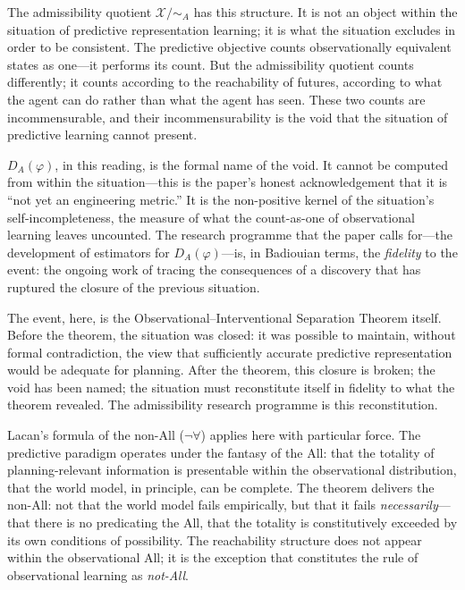 \documentclass[10pt,a4paper]{article}
\begin{document}
The admissibility quotient $\mathcal{X}/{\sim_A}$ has this structure. It is
not an object within the situation of predictive representation learning; it
is what the situation excludes in order to be consistent. The predictive
objective counts observationally equivalent states as one---it performs its
count. But the admissibility quotient counts differently; it counts according
to the reachability of futures, according to what the agent can do rather than
what the agent has seen. These two counts are incommensurable, and their
incommensurability is the void that the situation of predictive learning cannot
present.

$D_A(\varphi)$, in this reading, is the formal name of the void. It cannot be
computed from within the situation---this is the paper's honest acknowledgement
that it is ``not yet an engineering metric.'' It is the non-positive kernel of
the situation's self-incompleteness, the measure of what the count-as-one of
observational learning leaves uncounted. The research programme that the paper
calls for---the development of estimators for $D_A(\varphi)$---is, in Badiouian
terms, the \emph{fidelity} to the event: the ongoing work of tracing the
consequences of a discovery that has ruptured the closure of the previous
situation.

The event, here, is the Observational--Interventional Separation Theorem itself.
Before the theorem, the situation was closed: it was possible to maintain, without
formal contradiction, the view that sufficiently accurate predictive representation
would be adequate for planning. After the theorem, this closure is broken; the
void has been named; the situation must reconstitute itself in fidelity to what
the theorem revealed. The admissibility research programme is this reconstitution.

Lacan's formula of the non-All ($\neg\forall$) applies here with particular
force. The predictive paradigm operates under the fantasy of the All: that
the totality of planning-relevant information is presentable within the
observational distribution, that the world model, in principle, can be complete.
The theorem delivers the non-All: not that the world model fails empirically,
but that it fails \emph{necessarily}---that there is no predicating the All,
that the totality is constitutively exceeded by its own conditions of possibility.
The reachability structure does not appear within the observational All; it is
the exception that constitutes the rule of observational learning as \emph{not-All}.
\end{document}
